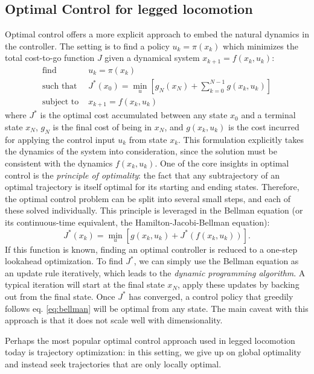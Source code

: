 \subsection{Optimal Control for legged locomotion}
Optimal control offers a more explicit approach to embed the natural dynamics in the controller.
The setting is to find a policy $u_k = \pi(x_k)$  which minimizes the total cost-to-go function $J$ given a dynamical system $x_{k+1} = f(x_k, u_k)$:
\begin{align*}
\text{find } & u_k = \pi(x_k) \\
\text{such that } & J^*(x_0) = \min_u \left[g_N(x_N) + \sum_{k=0}^{N-1}g(x_k, u_k)\right] \\
\text{subject to } & x_{k+1} = f(x_k, u_k)
\end{align*}
where $J^*$ is the optimal cost accumulated between any state $x_0$ and a terminal state $x_N$, $g_N$ is the final cost of being in $x_N$, and $g(x_k, u_k)$ is the cost incurred for applying the control input $u_k$ from state $x_k$.
This formulation explicitly takes the dynamics of the system into consideration, since the solution must be consistent with the dynamics $f(x_k, u_k)$.
One of the core insights in optimal control is the \emph{principle of optimality}: the fact that any subtrajectory of an optimal trajectory is itself optimal for its starting and ending states.
Therefore, the optimal control problem can be split into several small steps, and each of these solved individually.
This principle is leveraged in the Bellman equation (or its continuous-time equivalent, the Hamilton-Jacobi-Bellman equation):
\begin{equation}\label{eq:bellman}
J^*(x_k) = \min_u\left[g(x_k,u_k) + J^*(f(x_k, u_k)) \right].
\end{equation}
If this function is known, finding an optimal controller is reduced to a one-step lookahead optimization.
To find $J^*$, we can simply use the Bellman equation as an update rule iteratively, which leads to the \emph{dynamic programming algorithm}. A typical iteration will start at the final state $x_N$, apply these updates by backing out from the final state. Once $J^*$ has converged, a control policy that greedily follows eq. \ref{eq:bellman} will be optimal from any state.
The main caveat with this approach is that it does not scale well with dimensionality. \par
Perhaps the most popular optimal control approach used in legged locomotion today is trajectory optimization: in this setting, we give up on global optimality and instead seek trajectories that are only locally optimal.
